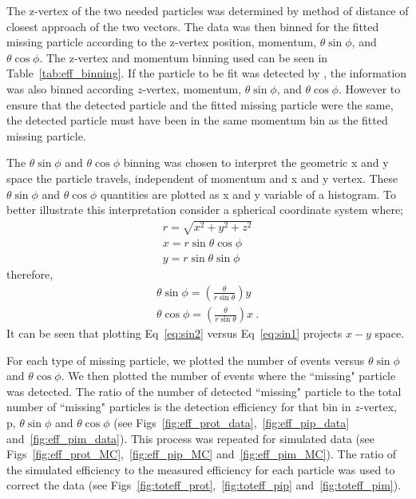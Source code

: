 The z-vertex of the two needed particles was determined by method of distance of closest approach of the two vectors. The data was then binned for the fitted missing particle according to the z-vertex position, momentum, $\theta \sin\phi$, and $\theta \cos\phi$. The z-vertex and momentum binning used can be seen in Table~\ref{tab:eff_binning}. If the particle to be fit was detected by , the information was also binned according $z$-vertex, momentum, $\theta \sin\phi$, and $\theta \cos\phi$. However to ensure that the detected particle and the fitted missing particle were the same, the detected particle must have been in the same momentum bin as the fitted missing particle.

The $\theta \sin\phi$ and $\theta \cos\phi$ binning was chosen to interpret the geometric x and y space the particle travels, independent of momentum and x and y vertex. These $\theta \sin\phi$ and $\theta \cos\phi$ quantities are plotted as x and y variable of a histogram. To better illustrate this interpretation consider a spherical coordinate system where;
\begin{align}
r=\sqrt{x^2 + y^2 + z^2} \\
x = r\sin\theta\cos\phi \\
y = r\sin\theta\sin\phi
\end{align}
therefore,
\begin{align}
\theta \sin\phi = \left(\frac{\theta}{r\sin\theta}\right)y \label{eq:sin1} \\
\theta \cos\phi = \left(\frac{\theta}{r\sin\theta}\right)x \label{eq:sin2} \ .
\end{align}
It can be seen that plotting Eq~\ref{eq:sin2} versus Eq~\ref{eq:sin1} projects $x-y$ space.

For each type of missing particle, we plotted the number of events versus $\theta \sin\phi$ and $\theta \cos\phi$. We then plotted the number of events where the ``missing" particle was detected. The ratio of the number of detected ``missing" particle to the total number of ``missing" particles is the detection efficiency for that bin in $z$-vertex, p, $\theta \sin\phi$ and $\theta \cos\phi$ (see Figs~\ref{fig:eff_prot_data},~\ref{fig:eff_pip_data} and~\ref{fig:eff_pim_data}). This process was repeated for simulated data (see Figs~\ref{fig:eff_prot_MC},~\ref{fig:eff_pip_MC} and~\ref{fig:eff_pim_MC}). The ratio of the simulated efficiency to the measured efficiency for each particle was used to correct the data (see Figs~\ref{fig:toteff_prot},~\ref{fig:toteff_pip} and~\ref{fig:toteff_pim}).
\FloatBarrier

